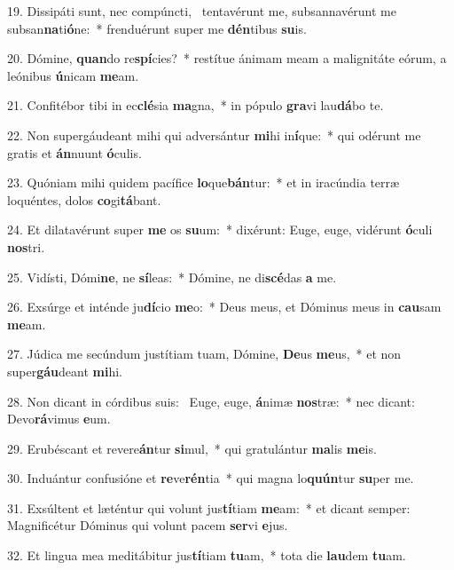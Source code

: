 19. Dissipáti sunt, nec compúncti, \dag\  tentavérunt me, subsannavérunt me subsan\textbf{na}ti\textbf{ó}ne:~*  frenduérunt super me \textbf{dén}tibus \textbf{su}is.\

20. Dómine, \textbf{quan}do re\textbf{spí}cies?~*  restítue ánimam meam a malignitáte eórum, a leónibus \textbf{ú}nicam \textbf{me}am.\

21. Confitébor tibi in ec\textbf{clé}sia \textbf{ma}gna,~*  in pópulo \textbf{gra}vi lau\textbf{dá}bo te.\

22. Non supergáudeant mihi qui adversántur \textbf{mi}hi in\textbf{í}que:~*  qui odérunt me gratis et \textbf{án}nuunt \textbf{ó}culis.\

23. Quóniam mihi quidem pacífice \textbf{lo}que\textbf{bán}tur:~*  et in iracúndia terræ loquéntes, dolos \textbf{co}gi\textbf{tá}bant.\

24. Et dilatavérunt super \textbf{me} os \textbf{su}um:~*  dixérunt: Euge, euge, vidérunt \textbf{ó}culi \textbf{nos}tri.\

25. Vidísti, Dómi\textbf{ne}, ne \textbf{sí}leas:~*  Dómine, ne di\textbf{scé}das \textbf{a} me.\

26. Exsúrge et inténde ju\textbf{dí}cio \textbf{me}o:~*  Deus meus, et Dóminus meus in \textbf{cau}sam \textbf{me}am.\

27. Júdica me secúndum justítiam tuam, Dómine, \textbf{De}us \textbf{me}us,~*  et non super\textbf{gáu}deant \textbf{mi}hi.\

28. Non dicant in córdibus suis: \dag\  Euge, euge, \textbf{á}nimæ \textbf{nos}træ:~*  nec dicant: Devo\textbf{rá}vimus \textbf{e}um.\

29. Erubéscant et revere\textbf{án}tur \textbf{si}mul,~*  qui gratulántur \textbf{ma}lis \textbf{me}is.\

30. Induántur confusióne et \textbf{re}ve\textbf{rén}tia~*  qui magna lo\textbf{quún}tur \textbf{su}per me.\

31. Exsúltent et læténtur qui volunt jus\textbf{tí}tiam \textbf{me}am:~*  et dicant semper: Magnificétur Dóminus qui volunt pacem \textbf{ser}vi \textbf{e}jus.\

32. Et lingua mea meditábitur jus\textbf{tí}tiam \textbf{tu}am,~*  tota die \textbf{lau}dem \textbf{tu}am.\

